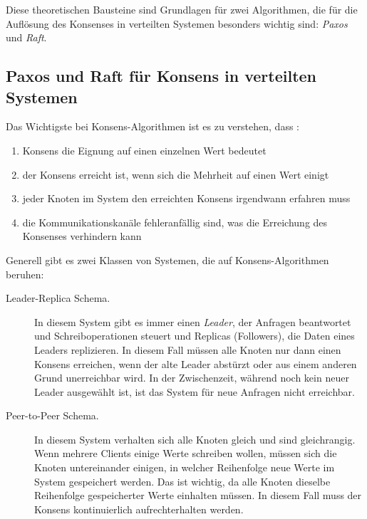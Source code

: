 Diese theoretischen Bausteine sind Grundlagen für zwei Algorithmen, die für die Auflösung des Konsenses in verteilten Systemen besonders wichtig sind: \textit{Paxos} und \textit{Raft}.

\subsection{Paxos und Raft für Konsens in verteilten Systemen}

Das Wichtigste bei Konsens-Algorithmen ist es zu verstehen, dass \cite{Saber03consensusproblems}:

\begin{enumerate}
	\item Konsens die Eignung auf einen einzelnen Wert bedeutet
	
	\item der Konsens erreicht ist, wenn sich die Mehrheit auf einen Wert einigt
	
	\item jeder Knoten im System den erreichten Konsens irgendwann erfahren muss
	
	\item die Kommunikationskanäle fehleranfällig sind, was die Erreichung des Konsenses verhindern kann
\end{enumerate}

Generell gibt es zwei Klassen von Systemen, die auf Konsens-Algorithmen beruhen:

\begin{description} 
	\item[Leader-Replica Schema.] In diesem System gibt es immer einen \textit{Leader}, der Anfragen beantwortet und Schreiboperationen steuert und Replicas (Followers), die Daten eines Leaders replizieren. In diesem Fall müssen alle Knoten nur dann einen Konsens erreichen, wenn der alte Leader abstürzt oder aus einem anderen Grund unerreichbar wird. In der Zwischenzeit, während noch kein neuer Leader ausgewählt ist, ist das System für neue Anfragen nicht erreichbar.
	
	\item[Peer-to-Peer Schema.] In diesem System verhalten sich alle Knoten gleich und sind gleichrangig. Wenn mehrere Clients einige Werte schreiben wollen, müssen sich die Knoten untereinander einigen, in welcher Reihenfolge neue Werte im System gespeichert werden. Das ist wichtig, da alle Knoten dieselbe Reihenfolge gespeicherter Werte einhalten müssen. In diesem Fall muss der Konsens kontinuierlich aufrechterhalten werden.
\end{description}

